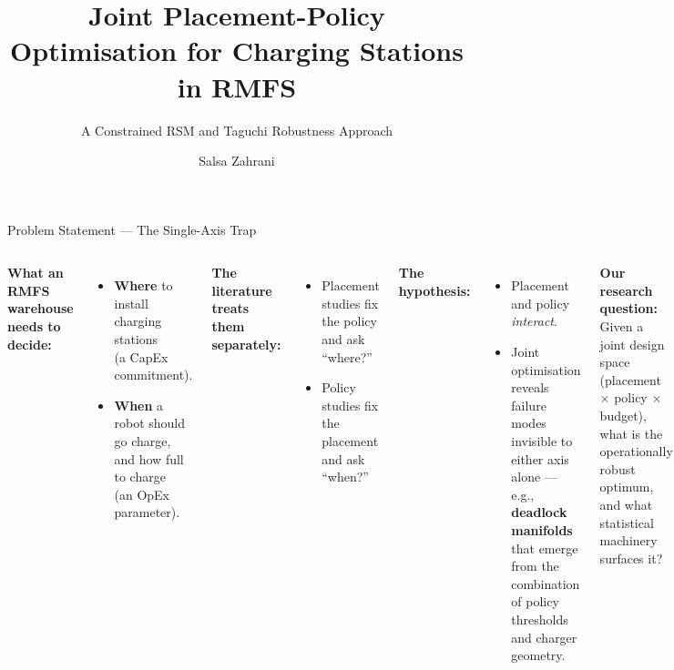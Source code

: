 \documentclass[aspectratio=169,10pt]{beamer}
\title{Joint Placement-Policy Optimisation for Charging Stations in RMFS}
\subtitle{A Constrained RSM and Taguchi Robustness Approach}
\author{Salsa Zahrani}
\institute{Engineering Management \\ Institut Teknologi Bandung}
\date{}
\begin{document}
\maketitle

\begin{frame}{Problem Statement --- The Single-Axis Trap}
  \begin{columns}[T]
    \footnotesize
    \textbf{What an RMFS warehouse needs to decide:}
    \begin{itemize}
      \item \textbf{Where} to install charging stations \\ (a CapEx commitment).
      \item \textbf{When} a robot should go charge, and how full to charge \\ (an OpEx parameter).
    \end{itemize}

    \vspace{0.4em}
    \textbf{The literature treats them separately:}
    \begin{itemize}
      \item Placement studies fix the policy and ask ``where?''
      \item Policy studies fix the placement and ask ``when?''
    \end{itemize}

    \footnotesize
    \textbf{The hypothesis:}
    \begin{itemize}
      \item Placement and policy \emph{interact}.
      \item Joint optimisation reveals failure modes invisible to either axis alone --- e.g., \textbf{deadlock manifolds} that emerge from the combination of policy thresholds and charger geometry.
    \end{itemize}

    \vspace{0.4em}
    \textbf{Our research question:}
    Given a joint design space (placement $\times$ policy $\times$ budget), what is the operationally robust optimum, and what statistical machinery surfaces it?
  \end{columns}
\end{frame}
\end{document}
